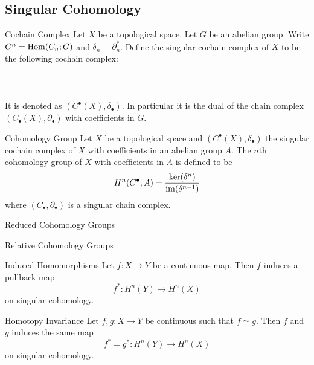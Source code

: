 \documentclass[a4paper]{article}
\begin{document}
\subsection{Singular Cohomology}
\begin{defn}{Cochain Complex}{} Let $X$ be a topological space. Let $G$ be an abelian group. Write $C^n=\operatorname{Hom}(C_n;G)$ and $\delta_n=\partial_n^\ast$. Define the singular cochain complex of $X$ to be the following cochain complex: \\~\\
\\~\\
It is denoted as $(C^\bullet(X),\delta_\bullet)$. In particular it is the dual of the chain complex $(C_\bullet(X),\partial_\bullet)$ with coefficients in $G$. 
\end{defn}

\begin{defn}{Cohomology Group}{} Let $X$ be a topological space and $(C^\bullet(X),\delta_\bullet)$ the singular cochain complex of $X$ with coefficients in an abelian group $A$. The $n$th cohomology group of $X$ with coefficients in $A$ is defined to be $$H^n(C^\bullet;A)=\frac{\ker(\delta^n)}{\operatorname{im}(\delta^{n-1})}$$ where $(C_\bullet,\partial_\bullet)$ is a singular chain complex. 
\end{defn}

\begin{thm}{Reduced Cohomology Groups}{}
\end{thm}

\begin{thm}{Relative Cohomology Groups}{}
\end{thm}

\begin{thm}{Induced Homomorphisms}{} Let $f:X\to Y$ be a continuous map. Then $f$ induces a pullback map $$f^\ast:H^n(Y)\to H^n(X)$$ on singular cohomology. 
\end{thm}

\begin{thm}{Homotopy Invariance}{} Let $f,g:X\to Y$ be continuous such that $f\simeq g$. Then $f$ and $g$ induces the same map $$f^\ast=g^\ast:H^n(Y)\to H^n(X)$$ on singular cohomology. 
\end{thm}
\end{document}
